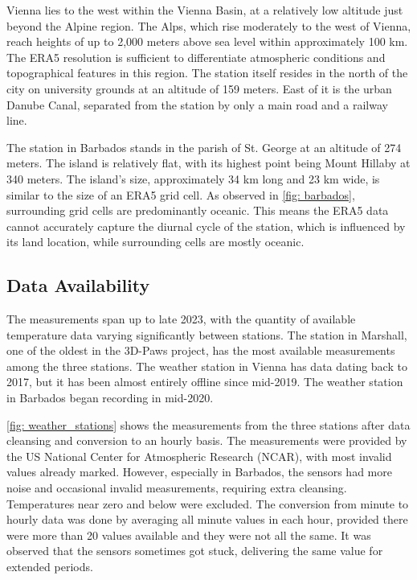 Vienna lies to the west within the Vienna Basin, at a relatively low altitude just beyond the Alpine region. The Alps, which rise moderately to the west of Vienna, reach heights of up to 2,000 meters above sea level within approximately 100 km.
The ERA5 resolution is sufficient to differentiate atmospheric conditions and topographical features in this region.
The station itself resides in the north of the city on university grounds at an altitude of 159 meters.
East of it is the urban Danube Canal, separated from the station by only a main road and a railway line.

The station in Barbados stands in the parish of St. George at an altitude of 274 meters. The island is relatively flat, with its highest point being Mount Hillaby at 340 meters.
The island's size, approximately 34 km long and 23 km wide, is similar to the size of an ERA5 grid cell.
As observed in \autoref{fig: barbados}, surrounding grid cells are predominantly oceanic.
This means the ERA5 data cannot accurately capture the diurnal cycle of the station, which is influenced by its land location, while surrounding cells are mostly oceanic.

\subsection{Data Availability}

The measurements span up to late 2023, with the quantity of available temperature data varying significantly between stations. The station in Marshall, one of the oldest in the 3D-Paws project, has the most available measurements among the three stations. The weather station in Vienna has data dating back to 2017, but it has been almost entirely offline since mid-2019. The weather station in Barbados began recording in mid-2020.

\autoref{fig: weather_stations} shows the measurements from the three stations after data cleansing and conversion to an hourly basis. The measurements were provided by the US National Center for Atmospheric Research (NCAR), with most invalid values already marked. However, especially in Barbados, the sensors had more noise and occasional invalid measurements, requiring extra cleansing. Temperatures near zero and below were excluded. The conversion from minute to hourly data was done by averaging all minute values in each hour, provided there were more than 20 values available and they were not all the same. It was observed that the sensors sometimes got stuck, delivering the same value for extended periods.

